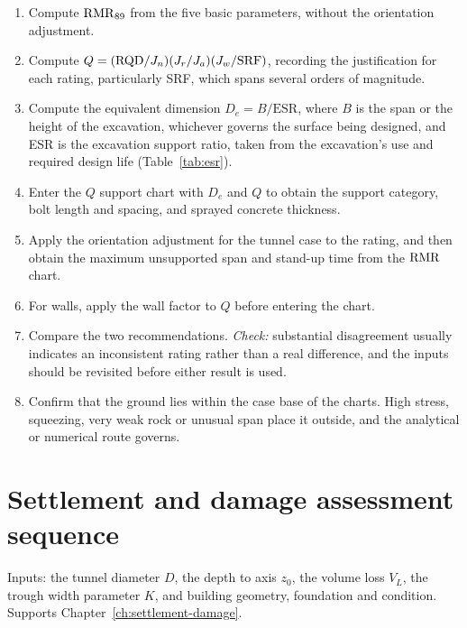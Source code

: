 \begin{enumerate}
  \item Compute $\mathrm{RMR}_{89}$ from the five basic parameters, without the
  orientation adjustment.
  \item Compute $Q = (\mathrm{RQD}/J_n)(J_r/J_a)(J_w/\mathrm{SRF})$, recording the
  justification for each rating, particularly SRF, which spans several
  orders of magnitude.
  \item Compute the equivalent dimension $D_e = B/\mathrm{ESR}$, where $B$ is
  the span or the height of the excavation, whichever governs the surface
  being designed, and ESR is the excavation support ratio, taken from the
  excavation's use and required design life (Table~\ref{tab:esr}).
  \item Enter the $Q$ support chart with $D_e$ and $Q$ to obtain the support
  category, bolt length and spacing, and sprayed concrete thickness.
  \item Apply the orientation adjustment for the tunnel case to the rating,
  and then obtain the maximum unsupported span and stand-up time from the
  $\mathrm{RMR}$ chart.
  \item For walls, apply the wall factor to $Q$ before entering the chart.
  \item Compare the two recommendations.
  \emph{Check:} substantial disagreement usually indicates an inconsistent
  rating rather than a real difference, and the inputs should be revisited
  before either result is used.
  \item Confirm that the ground lies within the case base of the charts. High
  stress, squeezing, very weak rock or unusual span place it outside, and the
  analytical or numerical route governs.
\end{enumerate}

\section{Settlement and damage assessment sequence}
\label{sec:seq-settlement}

Inputs: the tunnel diameter $D$, the depth to axis $z_0$, the volume loss
$V_L$, the trough width parameter $K$, and building geometry, foundation and
condition. Supports
Chapter~\ref{ch:settlement-damage}.

